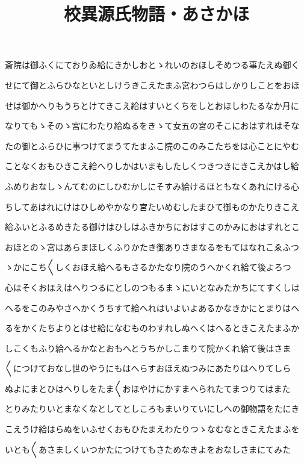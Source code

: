 \documentclass[a4paper,11pt,landscape]{ltjtarticle}
\title{校異源氏物語・あさかほ}
\date{}
\begin{document}
\maketitle

斎院は御ふくにておりゐ給にきかしおとゝれいのおほしそめつる事たえぬ御く
\par\medskip
せにて御とふらひなといとしけうきこえたまふ宮わつらはしかりしことをおほ
\par\medskip
せは御かへりもうちとけてきこえ給はすいとくちをしとおほしわたるなか月に
\par\medskip
なりてもゝそのゝ宮にわたり給ぬるをきゝて女五の宮のそこにおはすれはそな
\par\medskip
たの御とふらひに事つけてまうてたまふこ院のこのみこたちをは心ことにやむ
\par\medskip
ことなくおもひきこえ給へりしかはいまもしたしくつきつきにきこえかはし給
\par\medskip
ふめりおなしゝんてむのにしひむかしにそすみ給けるほともなくあれにける心
\par\medskip
ちしてあはれにけはひしめやかなり宮たいめむしたまひて御ものかたりきこえ
\par\medskip
給ふいとふるめきたる御けはひしはふきかちにおはすこのかみにおはすれとこ
\par\medskip
おほとのゝ宮はあらまほしくふりかたき御ありさまなるをもてはなれこゑふつ
\par\medskip
ゝかにこち〱しくおほえ給へるもさるかたなり院のうへかくれ給て後よろつ
\par\medskip
心ほそくおほえはへりつるにとしのつもるまゝにいとなみたかちにてすくしは
\par\medskip
へるをこのみやさへかくうちすて給へれはいよいよあるかなきかにとまりはへ
\par\medskip
るをかくたちよりとはせ給になむものわすれしぬへくはへるときこえたまふか
\par\medskip
しこくもふり給へるかなとおもへとうちかしこまりて院かくれ給て後はさま
\par\medskip
〱につけておなし世のやうにもはへらすおほえぬつみにあたりはへりてしら
\par\medskip
ぬよにまとひはへりしをたま〱おほやけにかすまへられたてまつりてはまた
\par\medskip
とりみたりいとまなくなとしてとしころもまいりていにしへの御物語をたにき
\par\medskip
こえうけ給はらぬをいふせくおもひたまえわたりつゝなむなときこえたまふを
\par\medskip
いとも〱あさましくいつかたにつけてもさためなきよをおなしさまにてみた
\end{document}
